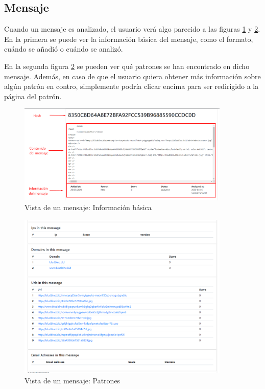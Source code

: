 \subsection{Mensaje}
Cuando un mensaje es analizado, el usuario verá algo parecido a las figuras \ref{fig:mensaje_datos} y \ref{fig:mensaje_patrones}. En la primera se puede ver la información básica del mensaje, como el formato, cuándo se añadió o cuándo se analizó. 

En la segunda figura \ref{fig:mensaje_patrones} se pueden ver qué patrones se han encontrado en dicho mensaje. Además, en caso de que el usuario quiera obtener más información sobre algún patrón en contro, simplemente podría clicar encima para ser redirigido a la página del patrón. 

\begin{figure}[htb]
    \centering
    \includegraphics[width=0.9\textwidth]{imagenes/capturasAplicacion/Mensaje_info.png}
\caption{Vista de un mensaje: Información básica}
\label{fig:mensaje_datos}
\end{figure}

\begin{figure}[htb]
    \centering
    \includegraphics[width=0.9\textwidth]{imagenes/capturasAplicacion/Mensaje_patrones.png}
\caption{Vista de un mensaje: Patrones}
\label{fig:mensaje_patrones}
\end{figure}
\clearpage
